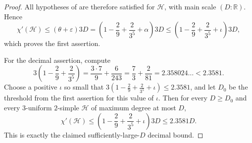 \begin{proof}
All hypotheses of  are therefore satisfied for
$\mathcal H$, with main scale $(D:\mathbb R)$.  Hence
\[
\chi'(\mathcal H)\le(\theta+\varepsilon)3D
=\left(1-\frac29+\frac{2}{3^5}+\alpha\right)3D
\le\left(1-\frac29+\frac{2}{3^5}+\iota\right)3D,
\]
which proves the first assertion.

For the decimal assertion, compute
\[
3\left(1-\frac29+\frac{2}{3^5}\right)
=\frac{3\cdot7}{9}+\frac{6}{243}
=\frac73+\frac{2}{81}
=2.358024\ldots <2.3581.
\]
Choose a positive $\iota$ so small that
$3(1-\frac29+\frac{2}{3^5}+\iota)\le 2.3581$, and let $D_0$ be the threshold
from the first assertion for this value of $\iota$.  Then for every
$D\ge D_0$ and every $3$-uniform $2$-simple $\mathcal H$ of maximum degree at
most $D$,
\[
\chi'(\mathcal H)\le
\left(1-\frac29+\frac{2}{3^5}+\iota\right)3D
\le 2.3581D .
\]
This is exactly the claimed sufficiently-large-$D$ decimal bound.
\end{proof}
